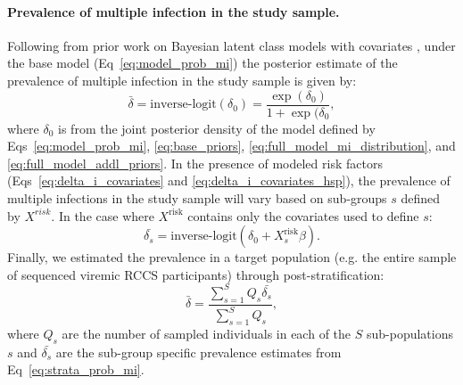 \documentclass[10pt,letterpaper]{article}
\begin{document}
\paragraph{Prevalence of multiple infection in the study sample.} 
Following from prior work on Bayesian latent class models with covariates \cite{thomson1998, shi2005, proustlima2007, williford2020, samerei2021, sotresalvarez2010}, under the base model (Eq~\ref{eq:model_prob_mi}) the posterior estimate of the prevalence of multiple infection in the study sample is given by: 
\begin{equation}
    \bar{\delta} = \text{inverse-logit}\left(\delta_0\right) = \frac{\exp(\delta_0)}{1+\exp(\delta_0},
\end{equation}
where $\delta_0$ is from the joint posterior density of the model defined by Eqs~\ref{eq:model_prob_mi}, \ref{eq:base_priors}, \ref{eq:full_model_mi_distribution}, and \ref{eq:full_model_addl_priors}.
In the presence of modeled risk factors (Eqs~\ref{eq:delta_i_covariates} and \ref{eq:delta_i_covariates_hsp}),
the prevalence of multiple infections in the study sample will vary based on sub-groups $s$ defined by $X^{risk}$. In the case where $X^\text{risk}$ contains only the covariates used to define $s$:
\begin{equation}
        \label{eq:strata_prob_mi}
    \bar{\delta_{s}} = \text{inverse-logit} \left( \delta_0 + X^\text{risk}_{s} \beta \right). 
\end{equation}
Finally, we estimated the prevalence in a target population (e.g. the entire sample of sequenced viremic RCCS participants) through post-stratification: 
\begin{equation}
    \bar{\delta} = \frac{\sum\limits_{s=1}^{S}Q_s\bar{\delta_{s}}}{\sum\limits_{s=1}^S Q_s},
\end{equation}
where $Q_s$ are the number of sampled individuals in each of the $S$ sub-populations $s$ and $\bar{\delta_{s}}$ are the sub-group specific prevalence estimates from Eq~\ref{eq:strata_prob_mi}. 
\end{document}
